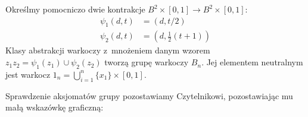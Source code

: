 \begin{definition}
%
    Określmy pomocniczo dwie kontrakcje $B^2 \times [0,1] \to B^2 \times [0,1]$:
    \begin{align*}
        \psi_1(d, t) & = (d, t/2) \\
        \psi_2(d, t) & = (d, \frac{1}{2} (t+1))
    \end{align*}
    Klasy abstrakcji warkoczy z~mnożeniem danym wzorem $z_1 z_2 = \psi_1(z_1) \cup \psi_2(z_2)$ tworzą grupę warkoczy $B_n$.
    Jej elementem neutralnym jest warkocz $1_n = \bigcup_{i = 1}^n \{x_1\} \times [0,1]$.
\end{definition}

Sprawdzenie aksjomatów grupy pozostawiamy Czytelnikowi,
pozostawiając mu małą wskazówkę graficzną:

